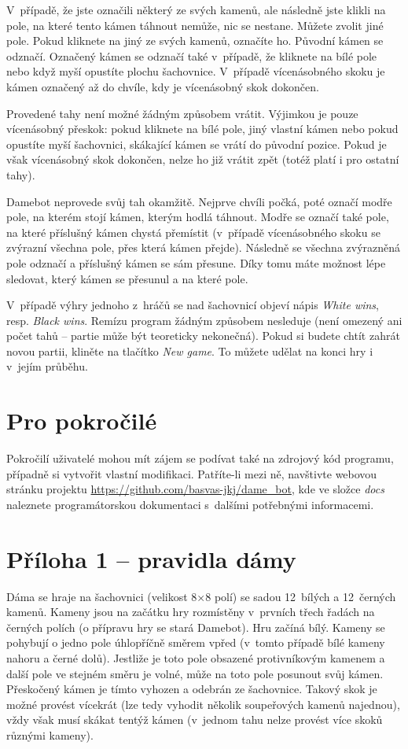 \documentclass[a4paper,12pt]{article}
\newcommand{\priloha}[1]{\section*{#1}\addcontentsline{toc}{section}{#1}}
\begin{document}
	V~případě, že jste označili některý ze svých kamenů, ale následně jste klikli na pole, na které tento kámen táhnout
	nemůže, nic se nestane. Můžete zvolit jiné pole. Pokud kliknete na jiný ze svých kamenů, označíte ho. Původní kámen se odznačí. Označený kámen se odznačí také v~případě, že kliknete na bílé pole nebo když myší opustíte plochu šachovnice.
	V~případě vícenásobného skoku je kámen označený až do chvíle, kdy je vícenásobný skok dokončen.
	
	Provedené tahy není možné žádným způsobem vrátit. Výjimkou je pouze vícenásobný přeskok: pokud kliknete na bílé pole,
	jiný vlastní kámen nebo pokud opustíte myší šachovnici, skákající kámen se vrátí do původní pozice. Pokud je však
	vícenásobný skok dokončen, nelze ho již vrátit zpět (totéž platí i pro ostatní tahy).
	
	Damebot neprovede svůj tah okamžitě. Nejprve chvíli počká, poté označí modře pole, na kterém stojí kámen, kterým hodlá
	táhnout. Modře se označí také pole, na které příslušný kámen chystá přemístit (v~případě vícenásobného skoku se
	zvýrazní všechna pole, přes která kámen přejde). Následně se všechna zvýrazněná pole odznačí a příslušný kámen
	se sám přesune. Díky tomu máte možnost lépe sledovat, který kámen se přesunul a na které pole.
	
	V~případě výhry jednoho z~hráčů se nad šachovnicí objeví nápis \textit{White wins}, resp. \textit{Black wins}. Remízu
	program žádným způsobem nesleduje (není omezený ani počet tahů -- partie může být teoreticky nekonečná). Pokud si
	budete chtít zahrát novou partii, kliněte na tlačítko \textit{New game}. To můžete udělat na konci hry i v~jejím
	průběhu.
	
	\section{Pro pokročilé}
	Pokročilí uživatelé mohou mít zájem se podívat také na zdrojový kód programu, případně si vytvořit vlastní modifikaci.
	Patříte-li mezi ně, navštivte webovou stránku projektu \url{https://github.com/basvas-jkj/dame_bot}, kde ve složce
	\textit{docs} naleznete programátorskou dokumentaci s~dalšími potřebnými informacemi.
	
	\priloha{Příloha 1 -- pravidla dámy}
	Dáma se hraje na šachovnici (velikost 8×8 polí) se sadou 12~bílých a 12~černých kamenů. Kameny jsou na začátku hry
	rozmístěny v~prvních třech řadách na černých polích (o přípravu hry se stará Damebot). Hru začíná bílý. Kameny se
	pohybují o jedno pole úhlopříčně směrem vpřed (v~tomto případě bílé kameny nahoru a černé dolů). Jestliže je toto
	pole obsazené protivníkovým kamenem a další pole ve stejném směru je volné, může na toto pole posunout svůj kámen.
	Přeskočený kámen je tímto vyhozen a odebrán ze šachovnice. Takový skok je možné provést vícekrát (lze tedy vyhodit
	několik soupeřových kamenů najednou), vždy však musí skákat tentýž kámen (v~jednom tahu nelze provést více skoků
	různými kameny).
	
\end{document}
